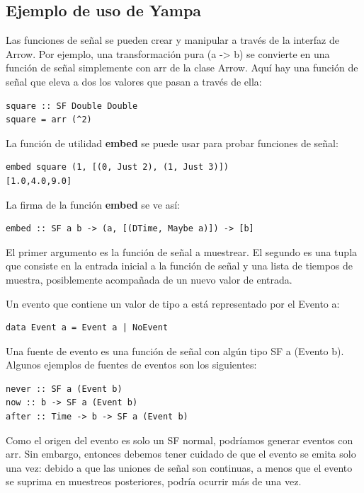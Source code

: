 \subsection{Ejemplo de uso de Yampa}

Las funciones de señal se pueden crear y manipular a través de la interfaz de Arrow. Por ejemplo, una transformación pura (a -> b) se convierte en una función de señal simplemente con arr de la clase Arrow. Aquí hay una función de señal que eleva a dos los valores que pasan a través de ella:

\begin{lstlisting}[frame=single]
square :: SF Double Double
square = arr (^2)
\end{lstlisting}

La función de utilidad \textbf{embed}  se puede usar para probar funciones de señal:

\begin{lstlisting}[frame=single]
embed square (1, [(0, Just 2), (1, Just 3)])
[1.0,4.0,9.0]
\end{lstlisting}

La firma de la función \textbf{embed} se ve así:

\begin{lstlisting}[frame=single]
embed :: SF a b -> (a, [(DTime, Maybe a)]) -> [b]
\end{lstlisting}

El primer argumento es la función de señal a muestrear. El segundo es una tupla que consiste en la entrada inicial a la función de señal y una lista de tiempos de muestra, posiblemente acompañada de un nuevo valor de entrada.

Un evento que contiene un valor de tipo a está representado por el Evento a:

\begin{lstlisting}[frame=single]
data Event a = Event a | NoEvent
\end{lstlisting}

Una fuente de evento es una función de señal con algún tipo SF a (Evento b). Algunos ejemplos de fuentes de eventos son los siguientes:

\begin{lstlisting}[frame=single]
never :: SF a (Event b)
now :: b -> SF a (Event b)
after :: Time -> b -> SF a (Event b)
\end{lstlisting}

Como el origen del evento es solo un SF normal, podríamos generar eventos con arr. Sin embargo, entonces debemos tener cuidado de que el evento se emita solo una vez: debido a que las uniones de señal son continuas, a menos que el evento se suprima en muestreos posteriores, podría ocurrir más de una vez.

